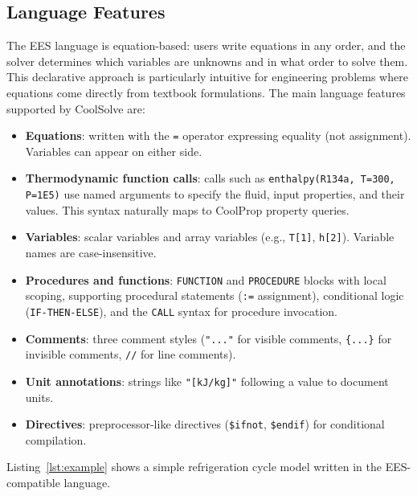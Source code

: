\documentclass[review,3p]{elsarticle}
\begin{document}
\subsection{Language Features}

The EES language is equation-based: users write equations in any order, and the solver determines which variables are unknowns and in what order to solve them. This declarative approach is particularly intuitive for engineering problems where equations come directly from textbook formulations. The main language features supported by CoolSolve are:

\begin{itemize}
    \item \textbf{Equations}: written with the \texttt{=} operator expressing equality (not assignment). Variables can appear on either side.
    \item \textbf{Thermodynamic function calls}: calls such as \texttt{enthalpy(R134a, T=300, P=1E5)} use named arguments to specify the fluid, input properties, and their values. This syntax naturally maps to CoolProp property queries.
    \item \textbf{Variables}: scalar variables and array variables (e.g., \texttt{T[1]}, \texttt{h[2]}). Variable names are case-insensitive.
    \item \textbf{Procedures and functions}: \texttt{FUNCTION} and \texttt{PROCEDURE} blocks with local scoping, supporting procedural statements (\texttt{:=} assignment), conditional logic (\texttt{IF-THEN-ELSE}), and the \texttt{CALL} syntax for procedure invocation.
    \item \textbf{Comments}: three comment styles (\texttt{"..."} for visible comments, \texttt{\{...\}} for invisible comments, \texttt{//} for line comments).
    \item \textbf{Unit annotations}: strings like \texttt{"[kJ/kg]"} following a value to document units.
    \item \textbf{Directives}: preprocessor-like directives (\texttt{\$ifnot}, \texttt{\$endif}) for conditional compilation.
\end{itemize}

Listing~\ref{lst:example} shows a simple refrigeration cycle model written in the EES-compatible language.
\end{document}
